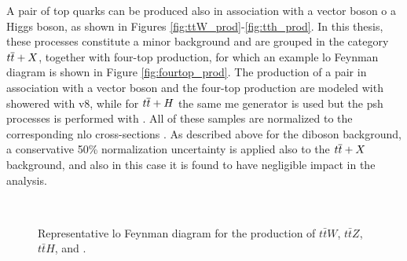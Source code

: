 A pair of top quarks can be produced also in association with a vector boson o a Higgs boson, as shown in Figures \ref{fig:ttW_prod}-\ref{fig:tth_prod}.
In this thesis, these processes constitute a minor background and are grouped in the category $t\overline{t}+X$, together with four-top production,
for which an example \gls{lo} Feynman diagram is shown in Figure \ref{fig:fourtop_prod}. 
The production of a \ttbar pair in association with a vector boson and the four-top production are modeled with \aNLO showered with \PY v8, while for $t\overline{t}+H$ the same 
\gls{me} generator is used but the \gls{psh} processes is performed with \HWpp. 
All of these samples are normalized to the corresponding \gls{nlo} cross-sections \cite{Alwall:2014hca,Heinemeyer:2013tqa}.
As described above for the diboson background, a conservative 50\% normalization uncertainty is applied also to the 
$t\overline{t}+X$ background, and also in this case it is found to have negligible impact in the analysis. 

\begin{figure}[h!]
\centering 
{}
 \\
\caption{Representative \gls{lo} Feynman diagram for the production of  $t\bar{t}W$,  $t\bar{t}Z$,  $t\bar{t}H$, and  \fourtop.}\label{fig:ttX_prod}
\end{figure}

